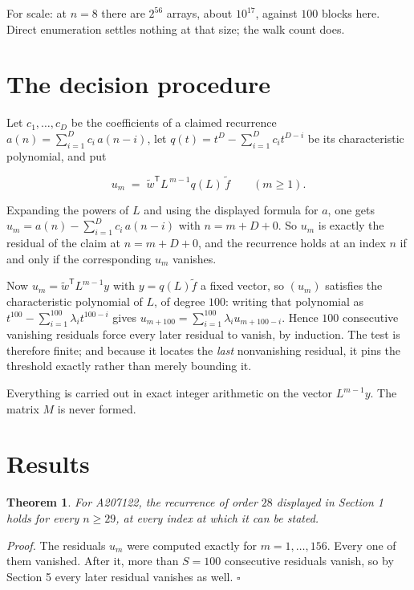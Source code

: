 \documentclass[11pt]{article}
\newtheorem{theorem}{Theorem}
\theoremstyle{definition}
\begin{document}
For scale: at $n = 8$ there are $2^{56}$ arrays, about $10^{17}$, against $100$ blocks here. Direct enumeration settles nothing at that size; the walk count does.

\section{The decision procedure}

Let $c_1,\dots,c_D$ be the coefficients of a claimed recurrence $a(n) = \sum_{i=1}^{D} c_i\,a(n-i)$, let $q(t) = t^{D} - \sum_{i=1}^{D} c_i t^{D-i}$ be its characteristic polynomial, and put

\[u_m \;=\; \tilde w^{\mathsf T} L^{\,m-1} q(L)\,\tilde f \qquad (m \ge 1).\]

Expanding the powers of $L$ and using the displayed formula for $a$, one gets $u_m = a(n) - \sum_{i=1}^{D} c_i\,a(n-i)$ with $n = m + D + 0$. So $u_m$ is exactly the residual of the claim at $n = m + D + 0$, and the recurrence holds at an index $n$ if and only if the corresponding $u_m$ vanishes.

Now $u_m = \tilde w^{\mathsf T} L^{m-1} y$ with $y = q(L)\tilde f$ a fixed vector, so $(u_m)$ satisfies the characteristic polynomial of $L$, of degree $100$: writing that polynomial as $t^{100} - \sum_{i=1}^{100} \lambda_i t^{100-i}$ gives $u_{m+100} = \sum_{i=1}^{100} \lambda_i u_{m+100-i}$. Hence $100$ consecutive vanishing residuals force every later residual to vanish, by induction. The test is therefore finite; and because it locates the {\itshape last} nonvanishing residual, it pins the threshold exactly rather than merely bounding it.

Everything is carried out in exact integer arithmetic on the vector $L^{m-1}y$. The matrix $M$ is never formed.

\section{Results}

\begin{theorem} For A207122, the recurrence of order $28$ displayed in Section 1 holds for every $n \ge 29$, at every index at which it can be stated.\end{theorem}

{\itshape Proof.} The residuals $u_m$ were computed exactly for $m = 1,\dots,156$. Every one of them vanished. After it, more than $S = 100$ consecutive residuals vanish, so by Section 5 every later residual vanishes as well. $\square$
\end{document}
